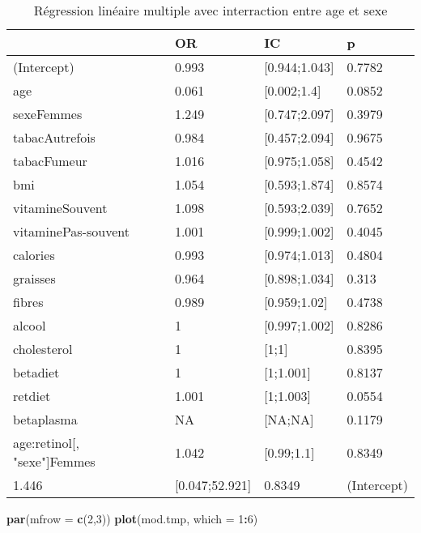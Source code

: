 \documentclass[]{article}
\newenvironment{Shaded}{\begin{snugshade}}{\end{snugshade}}
\newcommand{\KeywordTok}[1]{\textcolor[rgb]{0.13,0.29,0.53}{\textbf{#1}}}
\newcommand{\DataTypeTok}[1]{\textcolor[rgb]{0.13,0.29,0.53}{#1}}
\newcommand{\DecValTok}[1]{\textcolor[rgb]{0.00,0.00,0.81}{#1}}
\newcommand{\OperatorTok}[1]{\textcolor[rgb]{0.81,0.36,0.00}{\textbf{#1}}}
\newcommand{\NormalTok}[1]{#1}
\begin{document}
\begin{table}

\caption{\label{tab:unnamed-chunk-83}Régression linéaire multiple avec interraction entre age et sexe}
\centering
\begin{tabular}[t]{l|l|l|l}
\hline
  & OR & IC & p\\
\hline
\rowcolor[HTML]{BBD2E1}  (Intercept) & 0.993 & [0.944;1.043] & 0.7782\\
\hline
age & 0.061 & [0.002;1.4] & 0.0852\\
\hline
\rowcolor[HTML]{BBD2E1}  sexeFemmes & 1.249 & [0.747;2.097] & 0.3979\\
\hline
tabacAutrefois & 0.984 & [0.457;2.094] & 0.9675\\
\hline
\rowcolor[HTML]{BBD2E1}  tabacFumeur & 1.016 & [0.975;1.058] & 0.4542\\
\hline
bmi & 1.054 & [0.593;1.874] & 0.8574\\
\hline
\rowcolor[HTML]{BBD2E1}  vitamineSouvent & 1.098 & [0.593;2.039] & 0.7652\\
\hline
vitaminePas-souvent & 1.001 & [0.999;1.002] & 0.4045\\
\hline
\rowcolor[HTML]{BBD2E1}  calories & 0.993 & [0.974;1.013] & 0.4804\\
\hline
graisses & 0.964 & [0.898;1.034] & 0.313\\
\hline
\rowcolor[HTML]{BBD2E1}  fibres & 0.989 & [0.959;1.02] & 0.4738\\
\hline
alcool & 1 & [0.997;1.002] & 0.8286\\
\hline
\rowcolor[HTML]{BBD2E1}  cholesterol & 1 & [1;1] & 0.8395\\
\hline
betadiet & 1 & [1;1.001] & 0.8137\\
\hline
\rowcolor[HTML]{BBD2E1}  retdiet & 1.001 & [1;1.003] & 0.0554\\
\hline
betaplasma & NA & [NA;NA] & 0.1179\\
\hline
\rowcolor[HTML]{BBD2E1}  age:retinol[, "sexe"]Femmes & 1.042 & [0.99;1.1] & 0.8349\\
\hline
1.446 & [0.047;52.921] & 0.8349 & (Intercept)\\
\hline
\end{tabular}
\end{table}

\begin{Shaded}
\begin{Highlighting}[]
\KeywordTok{par}\NormalTok{(}\DataTypeTok{mfrow =} \KeywordTok{c}\NormalTok{(}\DecValTok{2}\NormalTok{,}\DecValTok{3}\NormalTok{))}
\KeywordTok{plot}\NormalTok{(mod.tmp, }\DataTypeTok{which =} \DecValTok{1}\OperatorTok{:}\DecValTok{6}\NormalTok{)}
\end{Highlighting}
\end{Shaded}
\end{document}
